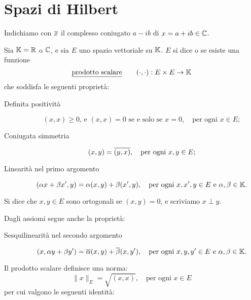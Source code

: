 \chapter{Spazi di Hilbert}
Indichiamo con $\overline{x}$ il complesso coniugato $a-ib$ di $x = a+ib \in \mathbb{C}$.

\begin{definition}
	Sia $\mathbb{K} = \mathbb{R}$ o $\mathbb{C}$, e sia $E$ uno spazio vettoriale su $\mathbb{K}$. $E$ si dice  o  se esiste una funzione
	\begin{equation*}
		\text{\underline{prodotto scalare}} \qquad (\cdot,\cdot) : E \times E \to \mathbb{K}
	\end{equation*}
	che soddisfa le seguenti proprietà:
	\begin{description}
		\item[Definita positività]
		\begin{equation*}
			\text{$(x,x) \geq 0$, e $(x,x) = 0$ se e solo se $x=0$}, \quad \text{per ogni $x \in E$};
		\end{equation*}
		\item[Coniugata simmetria]
		\begin{equation*}
			\text{$(x,y) = \overline{(y,x)}$}, \quad \text{per ogni $x,y \in E$};
		\end{equation*}
		\item[Linearità nel primo argomento]
		\begin{equation*}
			\text{$(\alpha x+ \beta x', y) = \alpha (x,y) + \beta (x',y)$}, \quad \text{per ogni $x,x',y \in E$ e $\alpha,\beta \in \mathbb{K}$.}
		\end{equation*}
	\end{description}
	Si dice che $x,y \in E$ sono ortogonali se $(x,y) = 0$, e scriviamo $x \perp y$.
\end{definition}

\begin{remark}
	Dagli assiomi segue anche la proprietà:
	\begin{description}
		\item[Sesquilinearità nel secondo argomento]
		\begin{equation*}
			\text{$(x, \alpha y + \beta y') = \overline{\alpha} (x,y) + \overline{\beta} (x,y')$}, \quad \text{per ogni $x,y,y' \in E$ e $\alpha,\beta \in \mathbb{K}$}.
		\end{equation*}
	\end{description}
\end{remark}

Il prodotto scalare definisce una norma:
\begin{equation*}
	\|x\|_E = \sqrt{(x,x)}, \quad \text{per ogni $x \in E$}
\end{equation*}
per cui valgono le seguenti identità:

